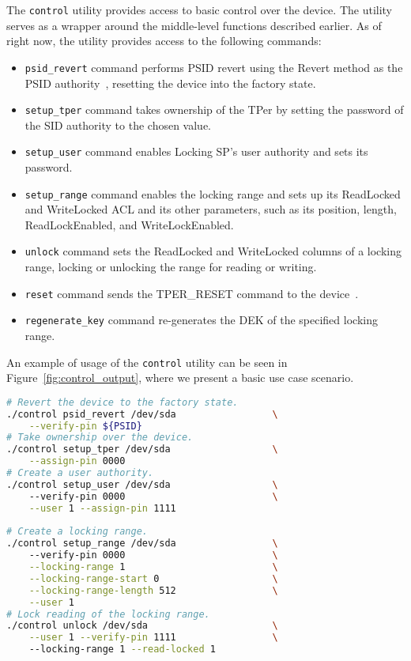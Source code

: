 The \verb|control| utility provides access to basic control over the device.
The utility serves as a wrapper around the middle-level functions described earlier.
As of right now, the utility provides access to the following commands:

\begin{itemize}
    \item \verb|psid_revert| command performs PSID revert using the Revert method as the PSID authority~\cite{tcg-psid}, resetting the device into the factory state.
    \item \verb|setup_tper| command takes ownership of the TPer by setting the password of the SID authority to the chosen value.
    \item \verb|setup_user| command enables Locking SP's user authority and sets its password.
    \item \verb|setup_range| command enables the locking range and sets up its ReadLocked and WriteLocked ACL and its other parameters, such as its position, length, ReadLockEnabled, and WriteLockEnabled.
    \item \verb|unlock| command sets the ReadLocked and WriteLocked columns of a locking range, locking or unlocking the range for reading or writing.
    \item \verb|reset| command sends the TPER\_RESET command to the device~\cite{tcg-storage-core}.
    \item \verb|regenerate_key| command re-generates the DEK of the specified locking range.
\end{itemize}

An example of usage of the \verb|control| utility can be seen in Figure~\ref{fig:control_output}, where we present a basic use case scenario.

    \begin{lstlisting}[language=bash,caption={Usage of the \texttt{control} utility},label={fig:control_output},keywordstyle=\color{black}]
# Revert the device to the factory state.
./control psid_revert /dev/sda                 \
    --verify-pin ${PSID}
# Take ownership over the device.
./control setup_tper /dev/sda                  \
    --assign-pin 0000
# Create a user authority.
./control setup_user /dev/sda                  \ 
    --verify-pin 0000                          \
    --user 1 --assign-pin 1111
    
# Create a locking range.
./control setup_range /dev/sda                 \ 
    --verify-pin 0000                          \
    --locking-range 1                          \
    --locking-range-start 0                    \
    --locking-range-length 512                 \
    --user 1 
# Lock reading of the locking range.
./control unlock /dev/sda                      \
    --user 1 --verify-pin 1111                 \ 
    --locking-range 1 --read-locked 1
\end{lstlisting}


